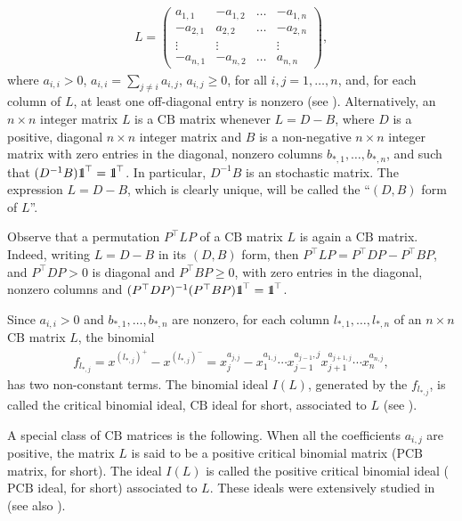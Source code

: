\documentclass[ALCO]{cedram}
\newcommand{\mbone}{\mbox{$1\mkern-4.6mu {\rm l}$}}
\newcommand{\pcb}{\mbox{$\mathrm{PCB}$}}
\newcommand{\cb}{\mbox{$\mathrm{CB}$}}
\begin{document}
\begin{eqnarray}\label{cbmatrix}
L=\left(\begin{array}{rrrr}
a_{1,1}&-a_{1,2}&\ldots&-a_{1,n}\\
-a_{2,1}&a_{2,2}&\ldots&-a_{2,n}\\
\vdots\phantom{+}&\vdots\phantom{+}&&\vdots\phantom{+}\\
-a_{n,1}&-a_{n,2}&\ldots&a_{n,n}
\end{array}\right),
\end{eqnarray}
where $a_{i,i}>0$, $a_{i,i}=\sum_{j\neq i}a_{i,j}$, $a_{i,j}\geq 0$,
for all $i,j=1,\ldots ,n$, and, for each column of $L$, at least one
off-diagonal entry is nonzero (see \cite{opv}). Alternatively, an
$n\times n$ integer matrix $L$ is a $\cb$ matrix whenever $L=D-B$,
where $D$ is a positive, diagonal $n\times n$ integer matrix and $B$
is a non-negative $n\times n$ integer matrix with zero entries in the
diagonal, nonzero columns $b_{*,1},\ldots ,b_{*,n}$, and such that
$(D^{-1}B)\mbone^{\top}=\mbone^{\top}$. In particular, $D^{-1}B$ is an
stochastic matrix. The expression $L=D-B$, which is clearly unique,
will be called the ``$(D,B)$ form of $L$''.

Observe that a permutation $P^{\top}LP$ of a $\cb$ matrix $L$ is again
a $\cb$ matrix. Indeed, writing $L=D-B$ in its $(D,B)$ form, then
$P^{\top}LP=P^{\top}DP-P^{\top}BP$, and $P^{\top}DP>0$ is diagonal and
$P^{\top}BP\geq 0$, with zero entries in the diagonal, nonzero columns
and $(P^{\top}DP)^{-1}(P^{\top}BP)\mbone^{\top}=\mbone^{\top}$.

Since $a_{i,i}>0$ and $b_{*,1},\ldots ,b_{*,n}$ are nonzero, for each
column $l_{*,1},\ldots ,l_{*,n}$ of an $n\times n$ $\cb$ matrix $L$,
the binomial
\begin{eqnarray*}
f_{l_{*,j}}=x^{(l_{*,j})^+}-x^{(l_{*,j})^-}=x_j^{a_{j,j}}-x_1^{a_{1,j}}\cdots
x_{j-1}^{a_{j-1},j}x_{j+1}^{a_{j+1,j}}\cdots x_n^{a_{n,j}},
\end{eqnarray*}
has two non-constant terms. The binomial ideal $I(L)$, generated by
the $f_{l_{*,j}}$, is called the critical binomial ideal, $\cb$ ideal
for short, associated to $L$ (see \cite{opv}).

A special class of $\cb$ matrices is the following. When all the
coefficients $a_{i,j}$ are positive, the matrix $L$ is said to be a
positive critical binomial matrix ($\pcb$ matrix, for short). The
ideal $I(L)$ is called the positive critical binomial ideal ($\pcb$
ideal, for short) associated to $L$. These ideals were extensively
studied in \cite{op} (see also \cite{opv}).
\end{document}
